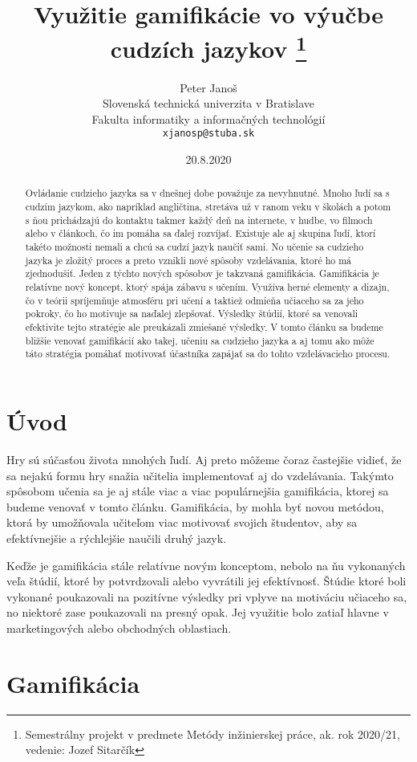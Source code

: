 \documentclass[10pt,twoside,slovak,a4paper]{article}
\title{Využitie gamifikácie vo výučbe cudzích jazykov \thanks{Semestrálny projekt v predmete Metódy inžinierskej práce, ak. rok 2020/21, vedenie: Jozef Sitarčík}} %
\author{Peter Janoš\\[2pt]
	{\small Slovenská technická univerzita v Bratislave}\\
	{\small Fakulta informatiky a informačných technológií}\\
	{\small \texttt{xjanosp@stuba.sk}}
	}
\date{\small 20.8.2020} %
\begin{document}
\maketitle

\begin{abstract}
Ovládanie cudzieho jazyka sa v dnešnej dobe považuje za nevyhnutné. Mnoho ľudí sa s cudzím jazykom, ako napríklad angličtina, stretáva už v ranom veku v školách a potom s ňou prichádzajú do kontaktu takmer každý deň na internete, v hudbe, vo filmoch alebo v článkoch, čo im pomáha sa ďalej rozvíjať. Existuje ale aj skupina ľudí, ktorí takéto možnosti nemali a chcú sa cudzí jazyk naučiť sami. No učenie sa cudzieho jazyka je zložitý proces a preto vznikli nové spôsoby vzdelávania, ktoré ho má zjednodušiť. Jeden z týchto nových spôsobov je takzvaná gamifikácia. Gamifikácia je relatívne nový koncept, ktorý spája zábavu s učením. Využíva herné elementy a dizajn, čo v teórii spríjemňuje atmosféru pri učení a taktiež odmieňa učiaceho sa za jeho pokroky, čo ho motivuje sa naďalej zlepšovať. Výsledky štúdií, ktoré sa venovali efektivite tejto stratégie ale preukázali zmiešané výsledky. V tomto článku sa budeme bližšie venovať gamifikácií ako takej, učeniu sa cudzieho jazyka a aj tomu ako môže táto stratégia pomáhať motivovať účastníka zapájať sa do tohto vzdelávacieho procesu.
\end{abstract}



\section{Úvod}

Hry sú súčasťou života mnohých ľudí. Aj preto môžeme čoraz častejšie vidieť, že sa nejakú formu hry snažia učitelia implementovať aj do vzdelávania. Takýmto spôsobom učenia sa je aj stále viac a viac populárnejšia gamifikácia, ktorej sa budeme venovať v tomto článku. Gamifikácia, by mohla byť novou metódou, ktorá by umožňovala učiteľom viac motivovať svojich študentov, aby sa efektívnejšie a rýchlejšie naučili druhý jazyk. 

Keďže je gamifikácia stále relatívne novým konceptom, nebolo na ňu vykonaných veľa štúdií, ktoré by potvrdzovali alebo vyvrátili jej efektívnosť. Štúdie ktoré boli vykonané poukazovali na pozitívne výsledky pri vplyve na motiváciu učiaceho sa, no niektoré zase poukazovali na presný opak. Jej využitie bolo zatiaľ hlavne v marketingových alebo obchodných oblastiach.

\section{Gamifikácia} \label{nejaka}
\end{document}
